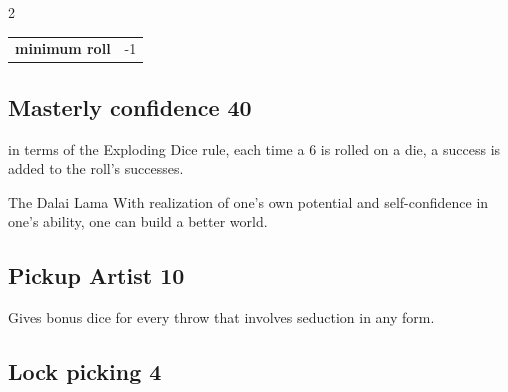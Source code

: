 \begin{multicols}{2}
\begin{tcolorbox}
\vspace{3mm}

\begin{tabular}{@{}ll@{}}
    \textbf{minimum roll} & -1\\
\end{tabular}


\end{tcolorbox}

\begin{tcolorbox}
    \subsection*{Masterly confidence \hfill \small{40 }}
    \tcblower
in terms of the Exploding Dice rule, each time a 6 is rolled on a die, a success is added to the roll's successes.

\begin{pquote}{The Dalai Lama}
With realization of one’s own potential and self-confidence in one’s ability, one can build a better world.
\end{pquote}

\vspace{3mm}



\end{tcolorbox}

\begin{tcolorbox}
    \subsection*{Pickup Artist \hfill \small{10 }}
    \tcblower
Gives bonus dice for every throw that involves seduction in any form.


\vspace{3mm}



\end{tcolorbox}

\begin{tcolorbox}
    \subsection*{Lock picking \hfill \small{4 }}
    \tcblower





\end{tcolorbox}
\end{multicols}
